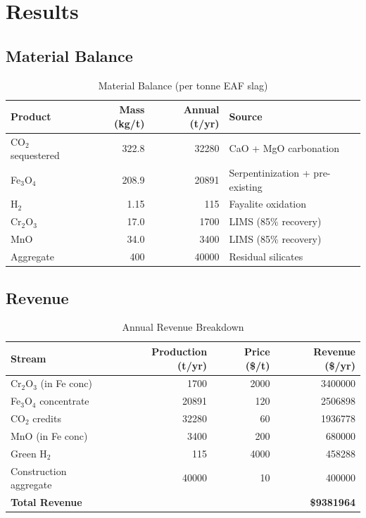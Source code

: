 \documentclass[11pt,a4paper]{article}
\begin{document}
\section{Results}

\subsection{Material Balance}

\begin{table}[H]
\centering
\caption{Material Balance (per tonne EAF slag)}
\label{tab:matbal}
\begin{tabular}{@{}lrrl@{}}
\toprule
\textbf{Product} & \textbf{Mass (kg/t)} & \textbf{Annual (t/yr)} & \textbf{Source} \\
\midrule
CO$_2$ sequestered & 322.8 & \num{32280} & CaO + MgO carbonation \\
Fe$_3$O$_4$ & 208.9 & \num{20891} & Serpentinization + pre-existing \\
H$_2$ & 1.15 & 115 & Fayalite oxidation \\
Cr$_2$O$_3$ & 17.0 & \num{1700} & LIMS (85\% recovery) \\
MnO & 34.0 & \num{3400} & LIMS (85\% recovery) \\
Aggregate & 400 & \num{40000} & Residual silicates \\
\bottomrule
\end{tabular}
\end{table}

\subsection{Revenue}

\begin{table}[H]
\centering
\caption{Annual Revenue Breakdown}
\label{tab:revenue}
\begin{tabular}{@{}lrrr@{}}
\toprule
\textbf{Stream} & \textbf{Production (t/yr)} & \textbf{Price (\$/t)} & \textbf{Revenue (\$/yr)} \\
\midrule
Cr$_2$O$_3$ (in Fe conc) & \num{1700} & \num{2000} & \num{3400000} \\
Fe$_3$O$_4$ concentrate & \num{20891} & 120 & \num{2506898} \\
CO$_2$ credits & \num{32280} & 60 & \num{1936778} \\
MnO (in Fe conc) & \num{3400} & 200 & \num{680000} \\
Green H$_2$ & 115 & \num{4000} & \num{458288} \\
Construction aggregate & \num{40000} & 10 & \num{400000} \\
\midrule
\textbf{Total Revenue} & & & \textbf{\$\num{9381964}} \\
\bottomrule
\end{tabular}
\end{table}
\end{document}
